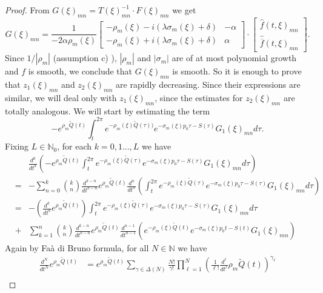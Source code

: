 \documentclass[sn-mathphys-num]{sn-jnl}%
\numberwithin{equation}{section}
\theoremstyle{thmstyleone}
\theoremstyle{thmstyletwo}
\theoremstyle{thmstylethree}
\begin{document}
\begin{proof}
 From $G(\xi)_{mn}=T(\xi)_{mn}^{-1} \cdot F(\xi)_{mn}$ we get
 $$G(\xi)_{mn}=\frac{1}{-2\alpha \rho_m(\xi)} \left[ \begin{array}{cr} -\rho_m(\xi)-i(\lambda \sigma_m(\xi)+\delta) & -\alpha \\ -\rho_m(\xi)+i(\lambda \sigma_m(\xi)+\delta) & \alpha \end{array} \right] \cdot \left[ \begin{array}{c} \widehat{f}(t,\xi)_{mn} \\ \widehat{\overline{f}}(t,\xi)_{mn} \end{array} \right].$$
 Since $1/|\rho_m|$ (assumption c) ), $|\rho_m|$ and $|\sigma_m|$ are of at most polynomial growth and $f$ is smooth, we conclude that $G(\xi)_{mn}$ is smooth. So it is enough to prove that $z_1(\xi)_{mn}$ and $z_2(\xi)_{mn}$ are rapidly decreasing. Since their expressions are similar, we will deal only with $z_1(\xi)_{mn}$, since the estimates for $z_2(\xi)_{mn}$ are totally analogous. We will start by estimating the term
 $$-e^{\rho_m \widetilde{Q}(t)}\int_t^{2\pi}e^{-\rho_m(\xi) \widetilde{Q}(\tau))}e^{-\sigma_m(\xi)p_0 \tau -S(\tau)}G_1(\xi)_{mn}d\tau.$$
 Fixing $L \in \mathbb{N}_0$, for each $k=0,1...,L$ we have
 \begin{eqnarray*}
 	& & \frac{d^k}{dt^k} \left(-e^{\rho_m \widetilde{Q}(t)}\int_t^{2\pi}e^{-\rho_m(\xi) \widetilde{Q}(\tau)}e^{-\sigma_m(\xi)p_0 \tau -S(\tau)}G_1(\xi)_{mn}d\tau \right) \\
 	& = & -\sum_{n=0}^k \binom{k}{n} \frac{d^{k-n}}{dt^{k-n}} e^{\rho_m \widetilde{Q}(t)} \frac{d^n}{dt^n} \left( \int_t^{2\pi}e^{-\rho_m(\xi) \widetilde{Q}(\tau)}e^{-\sigma_m(\xi)p_0 \tau -S(\tau)}G_1(\xi)_{mn}d\tau \right) \\
 	& = & - \left( \frac{d^k}{dt^k} e^{\rho_m\widetilde{Q}(t)} \right) \int_t^{2\pi}e^{-\rho_m(\xi) \widetilde{Q}(\tau)}e^{-\sigma_m(\xi)p_0 \tau -S(\tau)}G_1(\xi)_{mn}d\tau \\
 	& + &\sum_{k=1}^n \binom{k}{n} \frac{d^{k-n}}{dt^{k-n}} e^{\rho_m \widetilde{Q}(t)} \frac{d^{n-1}}{dt^{n-1}} \left(e^{-\rho_m(\xi) \widetilde{Q}(t)}e^{-\sigma_m(\xi)p_0 t -S(t)}G_1(\xi)_{mn} \right)  
 \end{eqnarray*}
 Again by Faà di Bruno formula, for all $N \in \mathbb{N}$ we have
 \begin{align}\label{bruno_1}
 	\frac{d^N}{dt^N} e^{\rho_m \widetilde{Q}(t)} & =  e^{\rho_m \widetilde{Q}(t)} \sum_{\gamma \in \Delta(N)} \frac{N!}{\gamma!} \prod_{\ell=1}^N \left(\frac{1}{\ell!} \frac{d^\ell}{dt^{\ell}} \rho_m \widetilde{Q}(t) \right)^{\gamma_\ell} \nonumber \\

\end{align}
\end{proof}
\end{document}
